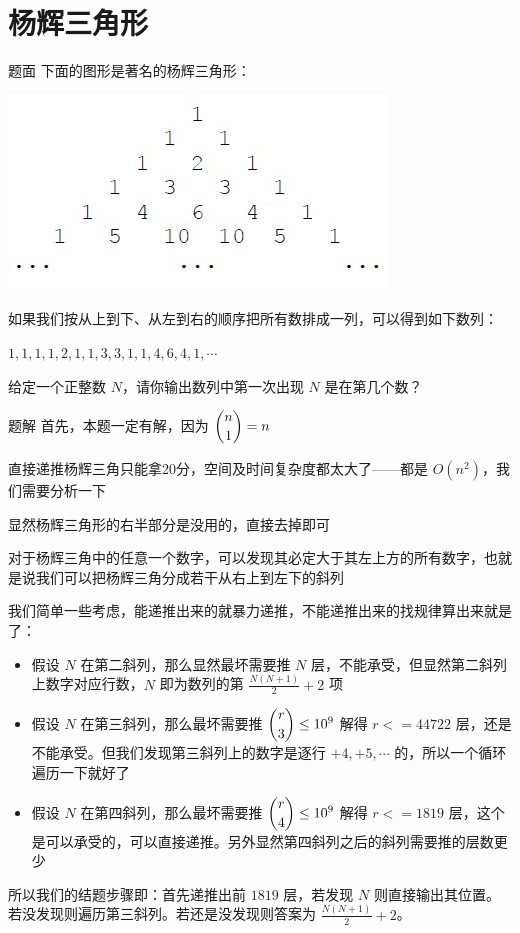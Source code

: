\documentclass{pptt}
\begin{document}
\section{杨辉三角形}

\begin{frame}{题面}
    下面的图形是著名的杨辉三角形：

    \includegraphics[scale=0.5]{images/yh.jpg}

    如果我们按从上到下、从左到右的顺序把所有数排成一列，可以得到如下数列：

    $1, 1, 1, 1, 2, 1, 1, 3, 3, 1, 1, 4, 6, 4, 1, \cdots$

    给定一个正整数 $N$，请你输出数列中第一次出现 $N$ 是在第几个数？
\end{frame}

\begin{frame}{题解}
    首先，本题一定有解，因为 $\dbinom{n}{1}=n$

    直接递推杨辉三角只能拿20分，空间及时间复杂度都太大了——都是 $O(n^2)$，我们需要分析一下

    显然杨辉三角形的右半部分是没用的，直接去掉即可

    对于杨辉三角中的任意一个数字，可以发现其必定大于其左上方的所有数字，也就是说我们可以把杨辉三角分成若干从右上到左下的斜列

    我们简单一些考虑，能递推出来的就暴力递推，不能递推出来的找规律算出来就是了：

\end{frame}

\begin{frame}
    \begin{itemize}
        \item 假设 $N$ 在第二斜列，那么显然最坏需要推 $N$ 层，不能承受，但显然第二斜列上数字对应行数，$N$ 即为数列的第 $\frac{N(N+1)}{2}+2$ 项
        \item 假设 $N$ 在第三斜列，那么最坏需要推 $\dbinom{r}{3} \leq {10}^9$ 解得 $r<=44722$ 层，还是不能承受。但我们发现第三斜列上的数字是逐行 $+4,+5,\cdots$ 的，所以一个循环遍历一下就好了
        \item 假设 $N$ 在第四斜列，那么最坏需要推 $\dbinom{r}{4} \leq {10}^9$ 解得 $r<=1819$ 层，这个是可以承受的，可以直接递推。另外显然第四斜列之后的斜列需要推的层数更少
    \end{itemize}

    所以我们的结题步骤即：首先递推出前 $1819$ 层，若发现 $N$ 则直接输出其位置。若没发现则遍历第三斜列。若还是没发现则答案为 $\frac{N(N+1)}{2}+2$。
\end{frame}
\end{document}
